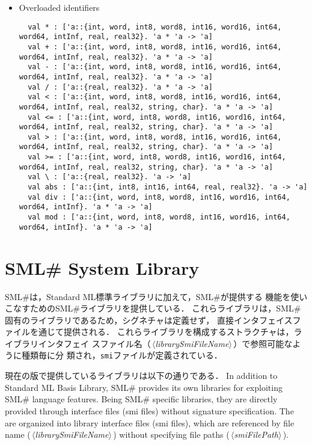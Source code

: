 \documentclass{jbook}
\newcommand{\txt}[2]{#2}
\newcommand{\smlsharp}{SML\#}
\newcommand{\code}[1]{\mbox{\large\tt #1}}
\newcommand{\nonterm}[1]{\mbox{$\,\langle$}{\it #1}\mbox{$\rangle\,$}}
\begin{document}
\begin{itemize}
\item {\txt{オーバロードされた識別子}{Overloaded identifiers}}
\begin{verbatim}
  val * : ['a::{int, word, int8, word8, int16, word16, int64, word64, intInf, real, real32}. 'a * 'a -> 'a]
  val + : ['a::{int, word, int8, word8, int16, word16, int64, word64, intInf, real, real32}. 'a * 'a -> 'a]
  val - : ['a::{int, word, int8, word8, int16, word16, int64, word64, intInf, real, real32}. 'a * 'a -> 'a]
  val / : ['a::{real, real32}. 'a * 'a -> 'a]
  val < : ['a::{int, word, int8, word8, int16, word16, int64, word64, intInf, real, real32, string, char}. 'a * 'a -> 'a]
  val <= : ['a::{int, word, int8, word8, int16, word16, int64, word64, intInf, real, real32, string, char}. 'a * 'a -> 'a]
  val > : ['a::{int, word, int8, word8, int16, word16, int64, word64, intInf, real, real32, string, char}. 'a * 'a -> 'a]
  val >= : ['a::{int, word, int8, word8, int16, word16, int64, word64, intInf, real, real32, string, char}. 'a * 'a -> 'a]
  val \ : ['a::{real, real32}. 'a -> 'a]
  val abs : ['a::{int, int8, int16, int64, real, real32}. 'a -> 'a]
  val div : ['a::{int, word, int8, word8, int16, word16, int64, word64, intInf}. 'a * 'a -> 'a]
  val mod : ['a::{int, word, int8, word8, int16, word16, int64, word64, intInf}. 'a * 'a -> 'a]
\end{verbatim}
\end{itemize}

\chapter{\txt{\smlsharp{}システムライブラリ}{\smlsharp{} System Library}}
\ifjp%
	\smlsharp{}は，Standard ML標準ライブラリに加えて，\smlsharp{}が提供する
機能を使いこなすための\smlsharp{}ライブラリを提供している．
	これらライブラリは，\smlsharp{}固有のライブラリであるため，シグネチャは定義せず，
直接インタフェイスファイルを通じて提供される．
	これらライブラリを構成するストラクチャは，ライブラリインタフェイ
スファイル名（\nonterm{librarySmiFileName}）で参照可能なように種類毎に分
類され，\code{smi}ファイルが定義されている．
	
	現在の版で提供しているライブラリは以下の通りである．
\else%
	In addition to Standard ML Basis Library, \smlsharp{} provides
its own libraries for exploiting \smlsharp{} language features.
	Being \smlsharp{} specific libraries, they are directly provided
through interface files (smi files) without signature specification.
	The are organized into library interface files (smi files),
which are referenced by file name (\nonterm{librarySmiFileName}) without
specifying file paths (\nonterm{smiFilePath}).
\end{document}

